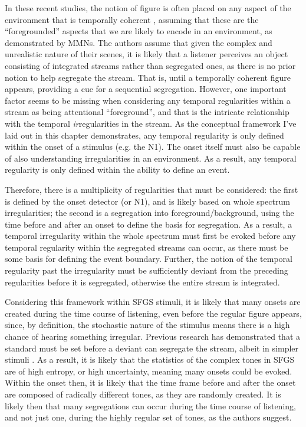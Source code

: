 \documentclass[a4paper,10pt,final]{ThesisStyle}
\begin{document}
In these recent studies, the notion of figure is often placed on any aspect of the environment that is temporally coherent \cite{Shamma2011,Teki2011a,Teki2013}, assuming that these are the ``foregrounded'' aspects that we are likely to encode in an environment, as demonstrated by MMNs.  The authors assume that given the complex and unrealistic nature of their scenes, it is likely that a listener perceives an object consisting of integrated streams rather than segregated ones, as there is no prior notion to help segregate the stream.  That is, until a temporally coherent figure appears, providing a cue for a sequential segregation.  However, one important factor seems to be missing when considering any temporal regularities within a stream as being attentional ``foreground'', and that is the intricate relationship with the temporal \textit{ir}regularities in the stream.  As the conceptual framework I've laid out in this chapter demonstrates, any temporal regularity is only defined within the onset of a stimulus (e.g. the N1).  The onset itself must also be capable of also understanding irregularities in an environment.  As a result, any temporal regularity is only defined within the ability to define an event.  

Therefore, there is a multiplicity of regularities that must be considered: the first is defined by the onset detector (or N1), and is likely based on whole spectrum irregularities; the second is a segregation into foreground/background, using the time before and after an onset to define the basis for segregation.  As a result, a temporal irregularity within the whole spectrum must first be evoked before any temporal regularity within the segregated streams can occur, as there must be some basis for defining the event boundary.  Further, the notion of the temporal regularity past the irregularity must be sufficiently deviant from the preceding regularities before it is segregated, otherwise the entire stream is integrated.  

Considering this framework within SFGS stimuli, it is likely that many onsets are created during the time course of listening, even before the regular figure appears, since, by definition, the stochastic nature of the stimulus means there is a high chance of hearing something irregular.  Previous research has demonstrated that a standard must be set before a deviant can segregate the stream, albeit in simpler stimuli \cite{Cowan1988}.  As a result, it is likely that the statistics of the complex tones in SFGS are of high entropy, or high uncertainty, meaning many onsets could be evoked.  Within the onset then, it is likely that the time frame before and after the onset are composed of radically different tones, as they are randomly created.  It is likely then that many segregations can occur during the time course of listening, and not just one, during the highly regular set of tones, as the authors suggest.  
\end{document}
